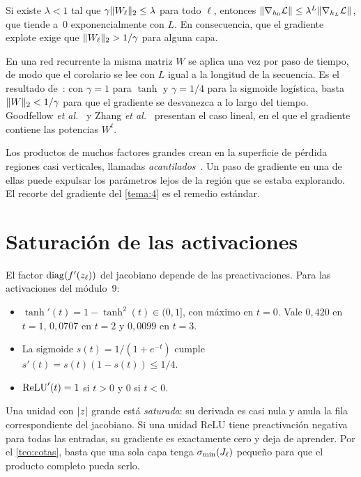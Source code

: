 \begin{corolario}\label{cor:pascanu}
Si existe $\lambda<1$ tal que $\gamma\lVert W_\ell\rVert_2\le\lambda$ para todo $\ell$, entonces $\lVert\nabla_{h_0}\mathcal{L}\rVert\le\lambda^{L}\lVert\nabla_{h_L}\mathcal{L}\rVert$, que tiende a~0 exponencialmente con $L$. En consecuencia, que el gradiente explote exige que $\lVert W_\ell\rVert_2>1/\gamma$ para alguna capa.
\end{corolario}

En una red recurrente la misma matriz $W$ se aplica una vez por paso de tiempo, de modo que el corolario se lee con $L$ igual a la longitud de la secuencia. Es el resultado de~\cite[§2.1]{pascanu}: con $\gamma=1$ para $\tanh$ y $\gamma=1/4$ para la sigmoide logística, basta $\lVert W\rVert_2<1/\gamma$ para que el gradiente se desvanezca a lo largo del tiempo. Goodfellow \emph{et al.}~\cite[§10.7]{gbc} y Zhang \emph{et al.}~\cite[§9.7.2]{d2l} presentan el caso lineal, en el que el gradiente contiene las potencias $W^{t}$.

\addtocounter{definicion}{1}%

\begin{observacion}
Los productos de muchos factores grandes crean en la superficie de pérdida regiones casi verticales, llamadas \emph{acantilados}~\cite[§8.2.4]{gbc}. Un paso de gradiente en una de ellas puede expulsar los parámetros lejos de la región que se estaba explorando. El recorte del gradiente del \cref{tema:4} es el remedio estándar.
\end{observacion}

\section{Saturación de las activaciones}

El factor $\operatorname{diag}(f'(z_\ell))$ del jacobiano depende de las preactivaciones. Para las activaciones del módulo~9:
\begin{itemize}[leftmargin=1.4em]
  \item $\tanh'(t)=1-\tanh^{2}(t)\in(0,1]$, con máximo en $t=0$. Vale $0{,}420$ en $t=1$, $0{,}0707$ en $t=2$ y $0{,}0099$ en $t=3$.
  \item La sigmoide $s(t)=1/(1+e^{-t})$ cumple $s'(t)=s(t)(1-s(t))\le 1/4$.
  \item $\operatorname{ReLU}'(t)=1$ si $t>0$ y $0$ si $t<0$.
\end{itemize}

Una unidad con $\lvert z\rvert$ grande está \emph{saturada}: su derivada es casi nula y anula la fila correspondiente del jacobiano. Si una unidad ReLU tiene preactivación negativa para todas las entradas, su gradiente es exactamente cero y deja de aprender. Por el \cref{teo:cotas}, basta que una sola capa tenga $\sigma_{\min}(J_\ell)$ pequeño para que el producto completo pueda serlo.

